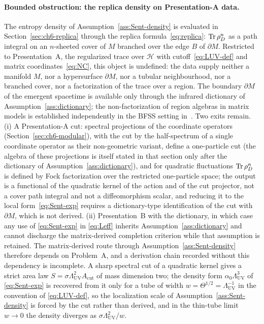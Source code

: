 \paragraph{Bounded obstruction: the replica density on Presentation-A data.}
The entropy density of Assumption~\ref{ass:Sent-density} is evaluated in
Section~\ref{sec:ch6-replica} through the replica formula~\eqref{eq:replica}:
\(\operatorname{Tr}\rho_D^n\) as a path integral on an \(n\)-sheeted cover of \(M\) branched
over the edge \(B\) of \(\partial M\). Restricted to Presentation~A, the
regularized trace over \(\mathcal H\) with cutoff~\eqref{eq:LUV-def} and matrix
coordinates~\eqref{eq:NC}, this object is undefined: the data supply neither a
manifold \(M\), nor a hypersurface \(\partial M\), nor a tubular neighbourhood,
nor a branched cover, nor a factorization of the trace over a region. The
boundary \(\partial M\) of the emergent spacetime is available only through the
infrared dictionary of Assumption~\ref{ass:dictionary}; the non-factorization
of region algebras in matrix models is established independently in the BFSS
setting in~\cite{Anous2020}. Two exits remain. (i) A Presentation-A cut:
spectral projections of the coordinate operators (Section~\ref{sec:ch6-modular}),
with the cut by the half-spectrum of a single coordinate operator as their
non-geometric variant, define a one-particle cut (the algebra of these
projections is itself stated in that section only after the dictionary of
Assumption~\ref{ass:dictionary}), and for quadratic fluctuations
\(\operatorname{Tr}\rho_D^n\) is defined by Fock factorization over the restricted
one-particle space; the
output is a functional of the quadratic kernel of the action and of the cut
projector, not a cover path integral and not a diffeomorphism scalar, and
reducing it to the local form~\eqref{eq:Sent-exp} requires a dictionary-type
identification of the cut with \(\partial M\), which is not derived.
(ii) Presentation~B with the dictionary, in which case any use of
\eqref{eq:Sent-exp} in \eqref{eq:Leff} inherits Assumption~\ref{ass:dictionary}
and cannot discharge the matrix-derived completion criterion while that
assumption is retained. The matrix-derived route through
Assumption~\ref{ass:Sent-density} therefore depends on Problem~A, and a
derivation chain recorded without this dependency is incomplete. A sharp
spectral cut of a quadratic kernel gives a strict area law
\(S=\sigma\Lambda_{\mathrm{UV}}^2 A_{\mathrm{cut}}\) of mass dimension two;
the density form \(\alpha_0\Lambda_{\mathrm{UV}}^3\) of \eqref{eq:Sent-exp} is
recovered from it only for a tube of width \(w=\Theta^{1/2}=\Lambda_{\mathrm{UV}}^{-1}\)
in the convention of \eqref{eq:LUV-def}, so the localization scale of
Assumption~\ref{ass:Sent-density} is forced by the cut rather than derived, and
in the thin-tube limit \(w\to0\) the density diverges as
\(\sigma\Lambda_{\mathrm{UV}}^2/w\).

